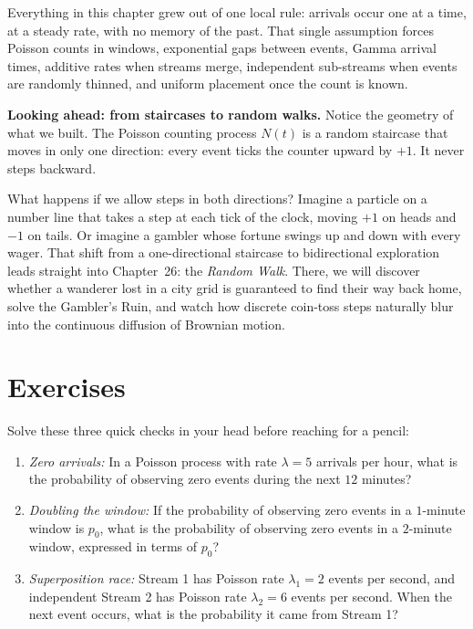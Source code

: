 \begin{aestheticbox}
Everything in this chapter grew out of one local rule: arrivals occur one at a time, at a
steady rate, with no memory of the past. That single assumption forces Poisson counts in
windows, exponential gaps between events, Gamma arrival times, additive rates when streams
merge, independent sub-streams when events are randomly thinned, and uniform placement once
the count is known.
\end{aestheticbox}

\chapterline

\textbf{Looking ahead: from staircases to random walks.}
Notice the geometry of what we built. The Poisson counting process $N(t)$ is a
random staircase that moves in only one direction: every event ticks the counter
upward by $+1$. It never steps backward.

What happens if we allow steps in both directions?
Imagine a particle on a number line that takes a step at each tick of the clock,
moving $+1$ on heads and $-1$ on tails. Or imagine a gambler whose fortune swings
up and down with every wager. That shift from a one-directional staircase to
bidirectional exploration leads straight into Chapter~26: the \emph{Random Walk}.
There, we will discover whether a wanderer lost in a city grid is guaranteed to find
their way back home, solve the Gambler's Ruin, and watch how discrete coin-toss
steps naturally blur into the continuous diffusion of Brownian motion.

\section{Exercises}
\label{ch25:exercises}

\begin{exercise}
\label{ch25:exr-mental}
Solve these three quick checks in your head before reaching for a pencil:
\begin{enumerate}
\item \emph{Zero arrivals:} In a Poisson process with rate $\lambda = 5$ arrivals
per hour, what is the probability of observing zero events during the next $12$
minutes?
\item \emph{Doubling the window:} If the probability of observing zero events in
a $1$-minute window is $p_0$, what is the probability of observing zero events in
a $2$-minute window, expressed in terms of $p_0$?
\item \emph{Superposition race:} Stream 1 has Poisson rate $\lambda_1 = 2$ events
per second, and independent Stream 2 has Poisson rate $\lambda_2 = 6$ events per
second. When the next event occurs, what is the probability it came from Stream 1?
\end{enumerate}
\end{exercise}

